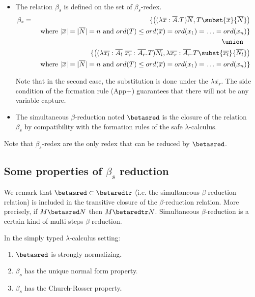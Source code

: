 \documentclass{article}
\begin{document}
\begin{dfn} \
\begin{itemize}
\item The relation $\beta_s$ is defined on the set of $\beta_s$-redex.
\begin{eqnarray*}
\beta_s &=&
 \{  \left( (\lambda \overline{x} : \overline{A} . T) \overline{N}, T\subst{\overline{x}}{\overline{N}} \right) \\
&& \mbox{ where }
     |\overline{x}| = |\overline{N}| = n \mbox{ and } ord(T) \leq ord(\overline{x}) = ord(x_1) = \ldots = ord(x_n)
\} \\
 && \union \quad \\
&&
\{
    \left( (\lambda \overline{x_l} : \overline{A_l} \  \overline{x_r}: \overline{A_r} . T) \overline{N_l}, \lambda \overline{x_r}: \overline{A_r} . T\subst{\overline{x_l}}{\overline{N_l}} \right) \\
&& \mbox{ where }
 |\overline{x}| = |\overline{N}| = n \mbox{ and } ord(T) \leq ord(\overline{x}) = ord(x_1) = \ldots = ord(x_n)
\}
\end{eqnarray*}

Note that in the second case, the substitution is done under the $\lambda \overline{x_r}$. The side condition
of the formation rule (App+) guarantees that there will not be any variable capture.

\item
The simultaneous $\beta$-reduction noted $\betasred$ is the closure
of the relation $\beta_s$ by compatibility with the formation rules
of the safe $\lambda$-calculus.
\end{itemize}
\end{dfn}

Note that $\beta_s$-redex are the only redex that can be reduced by
$\betasred$.




\subsection{Some properties of $\beta_s$ reduction}

We remark that $\betasred \subset \betaredtr$ (i.e. the simultaneous
$\beta$-reduction relation) is included in the transitive closure of
the $\beta$-reduction relation. More precisely, if $M \betasred N$
then $M \betaredtr N$. Simultaneous $\beta$-reduction is a certain
kind of multi-steps $\beta$-reduction.

\begin{lem} In the simply typed $\lambda$-calculus setting:
\begin{enumerate}
\item $\betasred$ is strongly normalizing.
\item $\beta_s$ has the unique normal form property.
\item $\beta_s$ has the Church-Rosser property.
\end{enumerate}
\end{lem}
\end{document}
